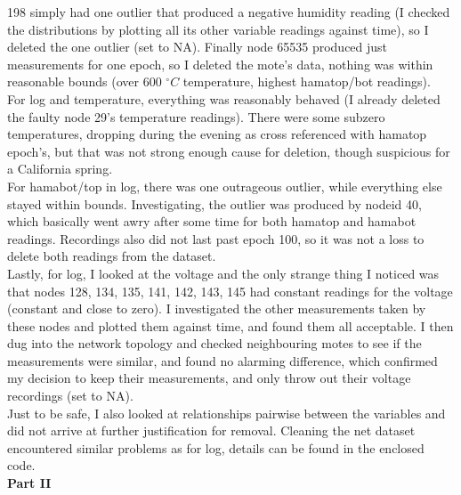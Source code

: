 \documentclass[english]{article}\usepackage[]{graphicx}\usepackage[]{color}
\begin{document}
198 simply had one outlier that produced a negative humidity reading (I checked the distributions by plotting all its other variable readings against time), so I deleted the one outlier (set to NA).  Finally node 65535 produced just measurements for one epoch, so I deleted the mote's data, nothing was within reasonable bounds (over 600 $^{\circ}C$ temperature, highest hamatop/bot readings).  \\

For log and temperature, everything was reasonably behaved (I already deleted the faulty node 29's temperature readings).  There were some subzero temperatures, dropping during the evening as cross referenced with hamatop epoch's, but that was not strong enough cause for deletion, though suspicious for a California spring.   \\

For hamabot/top in log, there was one outrageous outlier, while everything else stayed within bounds.  Investigating, the outlier was produced by nodeid 40, which basically went awry after some time for both hamatop and hamabot readings.  Recordings also did not last past epoch 100, so it was not a loss to delete both readings from the dataset.  \\

Lastly, for log, I looked at the voltage and the only strange thing I noticed was that nodes 128, 134, 135, 141, 142, 143, 145 had constant readings for the voltage (constant and close to zero). I investigated the other measurements taken by these nodes and plotted them against time, and found them all acceptable. I then dug into the network topology and checked neighbouring motes to see if the measurements were similar, and found no alarming difference, which confirmed my decision to keep their measurements, and only throw out their voltage recordings (set to NA).  \\

Just to be safe, I also looked at relationships pairwise between the variables and did not arrive at further justification for removal. Cleaning the net dataset encountered similar problems as for log, details can be found in the enclosed code.   \\

{\bf Part II}
\end{document}
